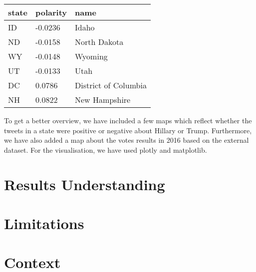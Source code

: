 \documentclass{article}
\begin{document}
  \begin{table}[H]
    \centering
    \begin{tabular}{||p{2cm} p{3cm} p{3cm} ||}
      \hline
      state & polarity & name \\ \hline
      ID & -0.0236 & Idaho \\
      ND & -0.0158 & North Dakota \\
      WY & -0.0148 & Wyoming \\
      UT & -0.0133 & Utah \\
      DC & 0.0786 & District of Columbia \\
      NH & 0.0822 & New Hampshire\\
      \hline
    \end{tabular}
    \caption{\label{tab:} }
  \end{table}

  To get a better overview, we have included a few maps which reflect
  whether the tweets in a state were positive or negative about
  Hillary or Trump. Furthermore, we have also added a map about the
  votes results in 2016 based on the external dataset. For the
  visualisation, we have used plotly and matplotlib.  
  
  \section{Results Understanding}
  \section{Limitations}
  \section{Context}
\end{document}
